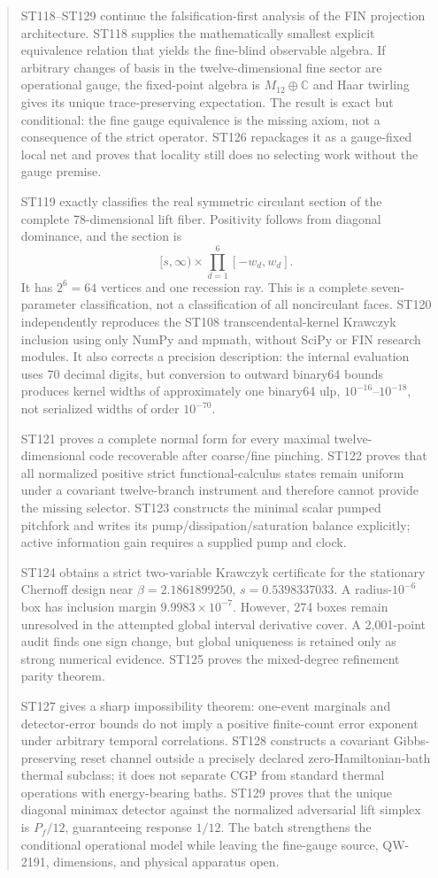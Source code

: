 \documentclass[11pt,a4paper]{article}
\begin{document}
\begin{abstract}
ST118--ST129 continue the falsification-first analysis of the FIN projection architecture. ST118 supplies the mathematically smallest explicit equivalence relation that yields the fine-blind observable algebra. If arbitrary changes of basis in the twelve-dimensional fine sector are operational gauge, the fixed-point algebra is $M_{12}\oplus\mathbb C$ and Haar twirling gives its unique trace-preserving expectation. The result is exact but conditional: the fine gauge equivalence is the missing axiom, not a consequence of the strict operator. ST126 repackages it as a gauge-fixed local net and proves that locality still does no selecting work without the gauge premise.

ST119 exactly classifies the real symmetric circulant section of the complete 78-dimensional lift fiber. Positivity follows from diagonal dominance, and the section is
\[
[s,\infty)\times\prod_{d=1}^{6}[-w_d,w_d].
\]
It has $2^6=64$ vertices and one recession ray. This is a complete seven-parameter classification, not a classification of all noncirculant faces. ST120 independently reproduces the ST108 transcendental-kernel Krawczyk inclusion using only NumPy and mpmath, without SciPy or FIN research modules. It also corrects a precision description: the internal evaluation uses 70 decimal digits, but conversion to outward binary64 bounds produces kernel widths of approximately one binary64 ulp, $10^{-16}$--$10^{-18}$, not serialized widths of order $10^{-70}$.

ST121 proves a complete normal form for every maximal twelve-dimensional code recoverable after coarse/fine pinching. ST122 proves that all normalized positive strict functional-calculus states remain uniform under a covariant twelve-branch instrument and therefore cannot provide the missing selector. ST123 constructs the minimal scalar pumped pitchfork and writes its pump/dissipation/saturation balance explicitly; active information gain requires a supplied pump and clock.

ST124 obtains a strict two-variable Krawczyk certificate for the stationary Chernoff design near $\beta=2.1861899250$, $s=0.5398337033$. A radius-$10^{-6}$ box has inclusion margin $9.9983\times10^{-7}$. However, 274 boxes remain unresolved in the attempted global interval derivative cover. A 2,001-point audit finds one sign change, but global uniqueness is retained only as strong numerical evidence. ST125 proves the mixed-degree refinement parity theorem.

ST127 gives a sharp impossibility theorem: one-event marginals and detector-error bounds do not imply a positive finite-count error exponent under arbitrary temporal correlations. ST128 constructs a covariant Gibbs-preserving reset channel outside a precisely declared zero-Hamiltonian-bath thermal subclass; it does not separate CGP from standard thermal operations with energy-bearing baths. ST129 proves that the unique diagonal minimax detector against the normalized adversarial lift simplex is $P_f/12$, guaranteeing response $1/12$. The batch strengthens the conditional operational model while leaving the fine-gauge source, QW-2191, dimensions, and physical apparatus open.
\end{abstract}
\end{document}
